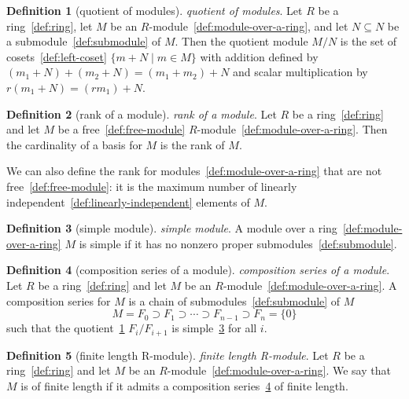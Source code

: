 \documentclass[12pt,a4paper]{article}
\theoremstyle{definition}
\newtheorem{definition}{Definition}
\begin{document}
\begin{definition}[quotient of modules]\label{def:quotient-of-modules}
\emph{quotient of modules}. Let $R$ be a ring~\ref{def:ring}, let $M$ be an $R$-module~\ref{def:module-over-a-ring}, and let $N\subseteq N$ be a submodule~\ref{def:submodule} of $M$. Then the quotient module $M/N$ is the set of cosets~\ref{def:left-coset} $\{m+N\mid m\in M\}$ with addition defined by $(m_1+N)+ (m_2+N) = (m_1+m_2) + N$ and scalar multiplication by $r(m_1 + N) = (rm_1)+N$.
\end{definition}

\begin{definition}[rank of a module]\label{def:rank-of-a-module}
\emph{rank of a module}. Let $R$ be a ring~\ref{def:ring} and let $M$ be a free~\ref{def:free-module} $R$-module~\ref{def:module-over-a-ring}. Then the cardinality of a basis for $M$ is the rank of $M$.

We can also define the rank for modules~\ref{def:module-over-a-ring} that are not free~\ref{def:free-module}: it is the maximum number of linearly independent~\ref{def:linearly-independent} elements of $M$.
\end{definition}

\begin{definition}[simple module]\label{def:simple-module}
\emph{simple module}. A module over a ring~\ref{def:module-over-a-ring} $M$ is simple if it has no nonzero proper submodules~\ref{def:submodule}.
\end{definition}

\begin{definition}[composition series of a module]\label{def:composition-series-of-a-module}
\emph{composition series of a module}. Let $R$ be a ring~\ref{def:ring} and let $M$ be an $R$-module~\ref{def:module-over-a-ring}. A composition series for $M$ is a chain of submodules~\ref{def:submodule} of $M$ $$M = F_0 \supset F_1 \supset \cdots \supset F_{n-1}\supset F_n =\{0\}$$ such that the quotient~\ref{def:quotient-of-modules} $F_i/F_{i+1}$ is simple~\ref{def:simple-module} for all $i$.
\end{definition}

\begin{definition}[finite length R-module]\label{def:finite-length-r-module}
\emph{finite length R-module}. Let $R$ be a ring~\ref{def:ring} and let $M$ be an $R$-module~\ref{def:module-over-a-ring}. We say that $M$ is of finite length if it admits a composition series~\ref{def:composition-series-of-a-module} of finite length.
\end{definition}
\end{document}
